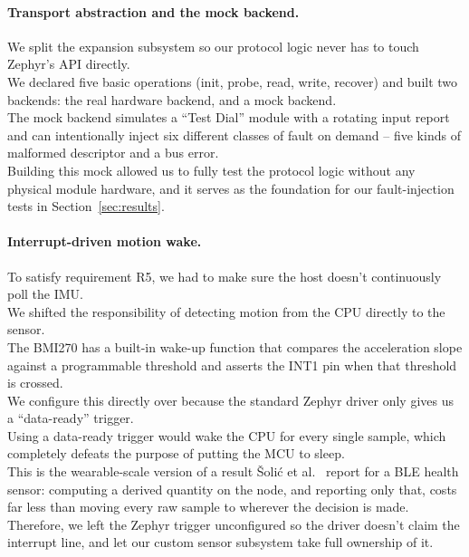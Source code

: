 \documentclass[12pt, a4paper]{article}
\begin{document}
\paragraph{Transport abstraction and the mock backend.} We split the expansion subsystem so our protocol logic never has to touch Zephyr's  API directly. \\
We declared five basic operations (init, probe, read, write, recover) and built two backends: the real  hardware backend, and a mock backend. \\
The mock backend simulates a ``Test Dial'' module with a rotating input report and can intentionally inject six different classes of fault on demand -- five kinds of malformed descriptor and a bus error. \\
Building this mock allowed us to fully test the protocol logic without any physical module hardware, and it serves as the foundation for our fault-injection tests in Section~\ref{sec:results}.

\paragraph{Interrupt-driven motion wake.}
\label{impl:wake}
To satisfy requirement R5, we had to make sure the host doesn't continuously poll the IMU. \\
We shifted the responsibility of detecting motion from the CPU directly to the sensor. \\
The BMI270 has a built-in wake-up function that compares the acceleration slope against a programmable threshold and asserts the INT1 pin when that threshold is crossed. \\
We configure this directly over  because the standard Zephyr driver only gives us a ``data-ready'' trigger. \\
Using a data-ready trigger would wake the CPU for every single sample, which completely defeats the purpose of putting the MCU to sleep. \\
This is the wearable-scale version of a result \v{S}oli\'{c} et al.~\cite{solic2024}
report for a BLE health sensor: computing a derived quantity on the node, and
reporting only that, costs far less than moving every raw sample to wherever the
decision is made. \\
Therefore, we left the Zephyr trigger unconfigured so the driver doesn't claim the interrupt line, and let our custom sensor subsystem take full ownership of it.
\end{document}
